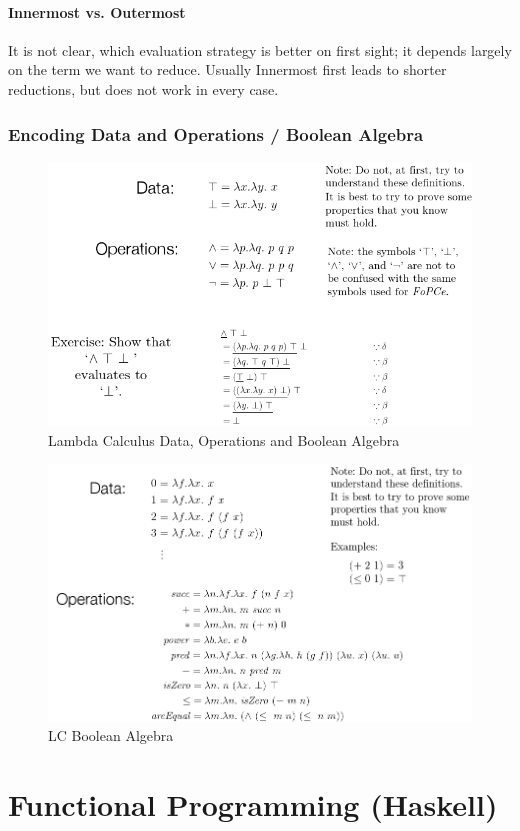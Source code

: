 \paragraph{Innermost vs. Outermost}

It is not clear, which evaluation strategy is better on first sight; it depends largely on the term we want to reduce. Usually Innermost first leads to shorter reductions, but does not work in every case.

\subsubsection{Encoding Data and Operations / Boolean Algebra}
\begin{figure}[H]
\centering
\includegraphics[width=0.7\linewidth]{images/lc_data_operations_algebra}
\caption{Lambda Calculus Data, Operations and Boolean Algebra}
\label{fig:lcdataoperationsalgebra}
\end{figure}

\begin{figure}[H]
\centering
\includegraphics[width=0.7\linewidth]{images/lc_algebra}
\caption{LC Boolean Algebra}
\label{fig:lcalgebra}
\end{figure}


\section{Functional Programming (Haskell)}

